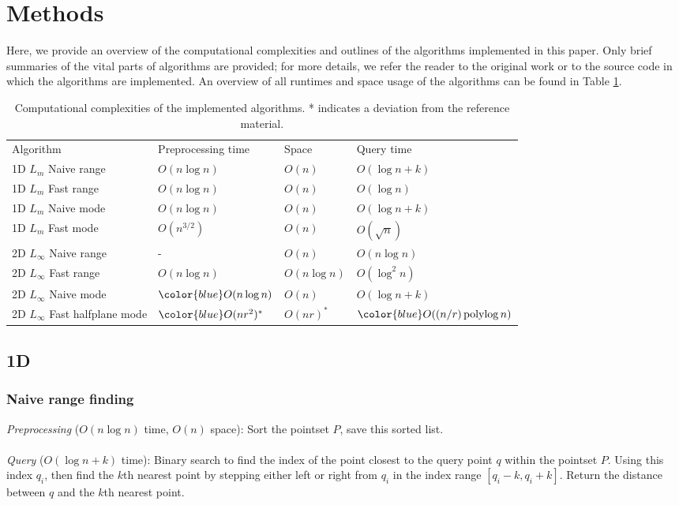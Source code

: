 \documentclass{article}
\newcommand{\fb}[1]{{\color{blue}#1}}
\DeclareMathOperator{\polylog}{polylog}
\begin{document}
\section{Methods}
Here, we provide an overview of the computational complexities and outlines of
the algorithms implemented in this paper. Only brief summaries of the vital
parts of algorithms are provided; for more details, we refer the reader to the
original work or to the source code in which the algorithms are implemented. An
overview of all runtimes and space usage of the algorithms can be found in
Table \ref{tab:runtimes}.
\begin{table}[h]
    \centering
    \begin{tabular}{llll}
        \toprule
        Algorithm   & Preprocessing time & Space         & Query time                 \\
        \cmidrule(lr){1-1}\cmidrule(lr){2-4}
        1D $L_{m}$ Naive range & $O(n \log n)$      & $O(n)$        & $O(\log n + k)$            \\
        1D $L_{m}$ Fast range  & $O(n \log n)$      & $O(n)$        & $O(\log n)$                \\
        1D $L_{m}$ Naive mode  & \fb{$O(n \log n)$} & \fb{$O(n)$}   & \fb{$O(\log n + k)$}       \\
        1D $L_{m}$ Fast mode   & $O(n^{3/2})$       & $O(n)$        & $O(\sqrt{n})$              \\
        \addlinespace[0.6em]
        2D $L_{\infty}$ Naive range & \fb{-}      & \fb{$O(n)$}       & \fb{$O(n \log n )$}           \\
        2D $L_{\infty}$ Fast range  & $O(n \log n)$      & $O(n \log n)$ & $O(\log^2 n)$              \\
        2D $L_{\infty}$ Naive mode  & $\fb{O(n \log n)}$ & $O(n)$        & \fb{$O(\log n + k)$}       \\
        2D $L_{\infty}$ Fast halfplane mode   & $\fb{O(nr^2)^*}$   & $O(nr)^*$     & $\fb{O((n/r) \polylog n)}$ \\
        \bottomrule
    \end{tabular}
    \caption{Computational complexities of the implemented algorithms. * indicates a deviation from the reference material.}
    \label{tab:runtimes}
\end{table}
\subsection{1D}
\subsubsection{Naive range finding}
\textit{Preprocessing} ($O(n \log n)$ time, $O(n)$ space): Sort the pointset $P$, save this sorted list. \\\\
\textit{Query} ($O(\log n + k)$ time): Binary search to find the index of the point closest to the query point $q$ within the pointset $P$. Using this index $q_i$, then find the $k$th nearest point by stepping either left or right from $q_i$ in the index range $[q_i-k, q_i+k]$. \fb{Return the distance between $q$ and the $k$th nearest point.}
\end{document}

